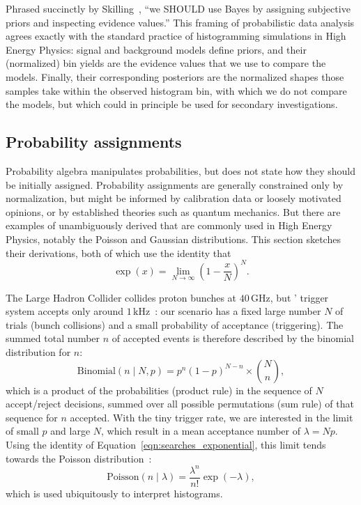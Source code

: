 Phrased succinctly by Skilling~\cite{skilling2008rant},
``we SHOULD use Bayes by assigning subjective priors and inspecting evidence
values.''
This framing of probabilistic data analysis agrees exactly with the standard
practice of histogramming simulations in High Energy Physics:
signal and background models define priors, and their (normalized) bin yields
are the evidence values that we use to compare the models.
Finally, their corresponding posteriors are the normalized shapes those samples
take within the observed histogram bin, with which we do not compare the
models, but which could in principle be used for secondary investigations.


\subsection{Probability assignments}
Probability algebra manipulates probabilities, but does not state how they
should be initially assigned.
Probability assignments are generally constrained only by normalization, but
might be informed by calibration data or loosely motivated opinions,
or by established theories such as quantum mechanics.
But there are examples of unambiguously derived that are commonly used in
High Energy Physics, notably the Poisson and Gaussian distributions.
This section sketches their derivations, both of which use the identity that
\begin{equation}
\label{eqn:searches_exponential}
\exp(x) =
\lim_{N \to \infty}\!
\left(1 - \frac{x}{N}\right)^N
.
\end{equation}

The Large Hadron Collider collides proton bunches at
$40\,\mathrm{GHz}$,
but \atlas' trigger system accepts only around
$1\,\mathrm{kHz}$~\cite{atlas2020trigger}:
our scenario has a fixed large number $N$ of trials
(bunch collisions)
and a small probability of acceptance (triggering).
The summed total number $n$ of accepted events is therefore described by the
binomial distribution for $n$:
\begin{equation}
\label{eqn:searches_binomial}
\mathrm{Binomial}(n\mid N, p) = p^n (1 - p)^{N - n} \times \binom{N}{n}
,
\end{equation}
which is a product of the probabilities (product rule) in the sequence of $N$
accept/reject decisions, summed over all possible permutations (sum rule) of
that sequence for $n$ accepted.
With the tiny trigger rate, we are interested in the limit of small
$p$ and large $N$, which result in a mean acceptance number of $\lambda = Np$.
Using the identity of Equation~\ref{eqn:searches_exponential},
this limit tends towards the Poisson distribution~\cite{jaynes2003probability}:
\begin{equation}
\label{eqn:searches_poisson}
\mathrm{Poisson}(n\mid \lambda) = \frac{\lambda^n}{n!}\exp(-\lambda)
,
\end{equation}
which is used ubiquitously to interpret histograms.

